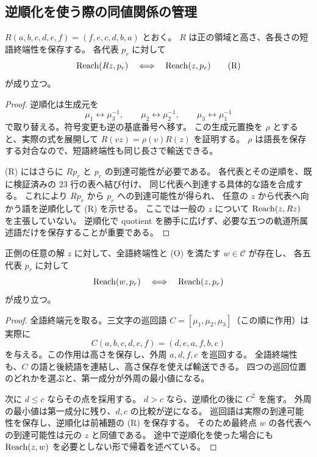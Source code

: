 \subsection{逆順化を使う際の同値関係の管理}

\begin{lemma}[逆順化による五代表への到達可能性の保存]
\label{bp:pos-reversal}
\leanok
$R(a,b,c,d,e,f)=(f,e,c,d,b,a)$ とおく。
$R$ は正の領域と高さ、各長さの短語終端性を保存する。
各代表 $p_r$ に対して
\[
 \operatorname{Reach}(Rz,p_r)\quad\Longleftrightarrow\quad\operatorname{Reach}(z,p_r)
 \tag{R}
\]
が成り立つ。
\end{lemma}

\begin{proof}
\leanok
逆順化は生成元を
\[
 \mu_1\leftrightarrow\mu_3^{-1},\qquad
 \mu_2\leftrightarrow\mu_2^{-1},\qquad
 \mu_3\leftrightarrow\mu_1^{-1}
\]
で取り替える。符号変更も逆の基底番号へ移す。
この生成元置換を $\rho$ とすると、実際の式を展開して
$R(vz)=\rho(v)R(z)$ を証明する。
$\rho$ は語長を保存する対合なので、短語終端性も同じ長さで輸送できる。

(R) にはさらに $Rp_r$ と $p_r$ の到達可能性が必要である。
各代表とその逆順を、既に検証済みの $23$ 行の表へ結び付け、
同じ代表へ到達する具体的な語を合成する。
これにより $Rp_r$ から $p_r$ への到達可能性が得られ、
任意の $z$ から代表へ向かう語を逆順化して (R) を示せる。
ここでは一般の $z$ について $\operatorname{Reach}(z,Rz)$ を主張していない。
逆順化で quotient を勝手に広げず、必要な五つの軌道所属述語だけを保存することが重要である。
\end{proof}

\begin{proposition}[順序付きの全語終端領域への帰着]
\label{bp:pos-sorted}
\leanok
正側の任意の解 $z$ に対して、全語終端性と (O) を満たす $w\in\mathcal C$ が存在し、
各五代表 $p_r$ に対して
\[
 \operatorname{Reach}(w,p_r)\quad\Longleftrightarrow\quad\operatorname{Reach}(z,p_r)
\]
が成り立つ。
\end{proposition}

\begin{proof}
\leanok
全語終端元を取る。三文字の巡回語
$C=[\mu_1,\mu_2,\mu_3]$（この順に作用）は実際に
\[
 C(a,b,c,d,e,f)=(d,e,a,f,b,c)
\]
を与える。この作用は高さを保存し、外周 $a,d,f,c$ を巡回する。
全語終端性も、$C$ の語と後続語を連結し、高さ保存を使えば輸送できる。
四つの巡回位置のどれかを選ぶと、第一成分が外周の最小値になる。

次に $d\leq c$ ならその点を採用する。
$d>c$ なら、逆順化の後に $C^2$ を施す。
外周の最小値は第一成分に残り、$d,c$ の比較が逆になる。
巡回語は実際の到達可能性を保存し、逆順化は前補題の (R) を保存する。
そのため最終点 $w$ の各代表への到達可能性は元の $z$ と同値である。
途中で逆順化を使った場合にも $\operatorname{Reach}(z,w)$ を必要としない形で帰着を述べている。
\end{proof}

